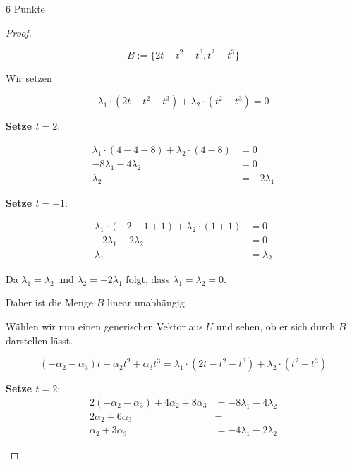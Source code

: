 \documentclass{problemset}
\begin{document}
\begin{problem}{6 Punkte}
\begin{proof}
\begin{enumerate}
              \[
                  B := \{2t - t^2 - t^3, t^2 - t^3\}
              \]

              Wir setzen

              \[
                  \lambda_1 \cdot (2t - t^2 - t^3) + \lambda_2 \cdot (t^2 - t^3) = 0
              \]

              \textbf{Setze $t = 2$}:

              \begin{align*}
                  \lambda_1 \cdot (4 - 4 - 8) + \lambda_2 \cdot (4 - 8) & = 0            \\
                  -8 \lambda_1 - 4 \lambda_2                            & = 0            \\
                  \lambda_2                                             & = -2 \lambda_1
              \end{align*}

              \textbf{Setze $t = -1$}:

              \begin{align*}
                  \lambda_1 \cdot (-2 - 1 + 1) + \lambda_2 \cdot (1 + 1) & = 0         \\
                  -2 \lambda_1 + 2 \lambda_2                             & = 0         \\
                  \lambda_1                                              & = \lambda_2
              \end{align*}

              Da $\lambda_1 = \lambda_2$ und $\lambda_2 = -2 \lambda_1$ folgt, dass
              $\lambda_1 = \lambda_2 = 0$.

              Daher ist die Menge $B$ linear unabhängig.

              Wählen wir nun einen generischen Vektor aus $U$ und sehen, ob er sich durch $B$
              darstellen lässt.

              \[
                  (-\alpha_2 - \alpha_3)t + \alpha_2t^2 + \alpha_3t^3 = \lambda_1 \cdot (2t - t^2 - t^3) + \lambda_2 \cdot (t^2 - t^3)
              \]

              \textbf{Setze $t = 2$}:
              \begin{align*}
                  2(-\alpha_2 - \alpha_3) + 4\alpha_2 + 8\alpha_3 & = -8 \lambda_1 - 4 \lambda_2 \\
                  2\alpha_2 + 6\alpha_3                           & =                            \\
                  \alpha_2 + 3\alpha_3                            & = -4 \lambda_1 - 2 \lambda_2
              \end{align*}


\end{enumerate}
\end{proof}
\end{problem}
\end{document}
